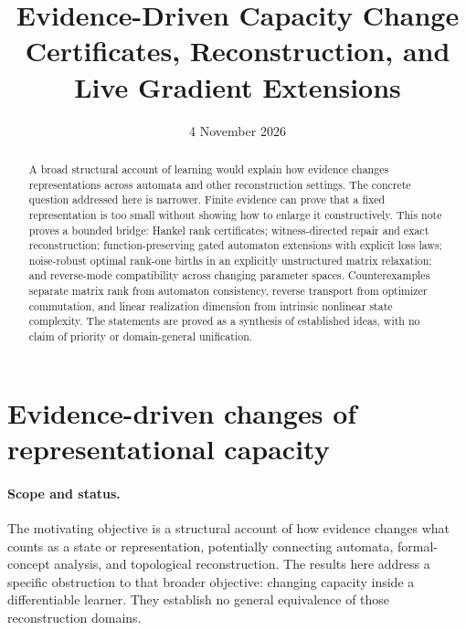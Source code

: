 \documentclass[11pt]{article}
\title{Evidence-Driven Capacity Change\\Certificates, Reconstruction, and Live Gradient Extensions}
\author{}
\date{4 November 2026}
\theoremstyle{definition}
\theoremstyle{remark}
\begin{document}
\maketitle
\begin{abstract}
A broad structural account of learning would explain how evidence changes
representations across automata and other reconstruction settings. The
concrete question addressed here is narrower. Finite evidence can prove
that a fixed representation is too small without
showing how to enlarge it constructively. This note proves a bounded bridge:
Hankel rank certificates; witness-directed repair and exact reconstruction;
function-preserving gated automaton extensions with explicit loss laws;
noise-robust optimal rank-one births in an explicitly unstructured matrix
relaxation; and reverse-mode compatibility across changing parameter spaces.
Counterexamples separate matrix rank from automaton consistency, reverse
transport from optimizer commutation, and linear realization dimension from
intrinsic nonlinear state complexity. The statements are proved as a synthesis
of established ideas, with no claim of priority or domain-general unification.
\end{abstract}
\tableofcontents
\bigskip

\section{Evidence-driven changes of representational capacity}
\label{ce:section}

\paragraph{Scope and status.}
The motivating objective is a structural account of how evidence changes
what counts as a state or representation, potentially connecting automata,
formal-concept analysis, and topological reconstruction. The results here
address a specific obstruction to that broader objective: changing capacity
inside a differentiable learner. They establish no general equivalence of
those reconstruction domains.
\end{document}
